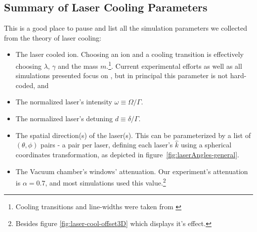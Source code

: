 %
%

\subsection{Summary of Laser Cooling Parameters}\label{sec:theory/cooling-summary}

This is a good place to pause and list all the simulation parameters we collected from the theory of laser cooling:

\begin{itemize}
    \item The laser cooled ion. Choosing an ion and a cooling transition is effectively choosing $\lambda$, $\gamma$ and the mass $m$.\footnote{Cooling transitions and line-widths were taken from \cite{CoolingBeParameters,CoolingCaParameters1,CoolingCaParameters2,RansfordThesis,RadiumData}}. Current experimental efforts as well as all simulations presented focus on , but in principal this parameter is not hard-coded, and 
    \item The normalized laser's intensity $\omega \equiv \Omega/\Gamma$.
    \item The normalized laser's detuning $d \equiv \delta/\Gamma$.
    \item The spatial direction(s) of the laser(s). This can be parameterized by a list of $(\theta, \phi)$ pairs - a pair per laser, defining each laser's $\hat{k}$ using a spherical coordinates transformation, as depicted in figure~\ref{fig:laserAngles-general}.
    \item The Vacuum chamber's windows' attenuation. Our experiment's attenuation is $\alpha = 0.7$, and most simulations used this value.\footnote{Besides figure \ref{fig:laser-cool-offset3D} which displays it's effect.}
\end{itemize}

